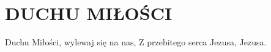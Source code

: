 \documentclass[../../../songbook.tex]{subfiles}
\begin{document}
\TabPositions{8cm} %
\section*{DUCHU MIŁOŚCI}
{}
\vspace{0.5cm}
Duchu Miłości, wylewaj się na nas,	 \newline	
Z przebitego serca Jezusa, Jezusa. 	 \newline	
\end{document}

